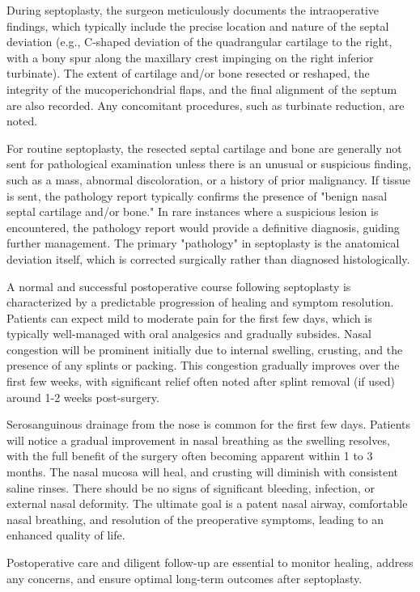 During septoplasty, the surgeon meticulously documents the intraoperative findings, which typically include the precise location and nature of the septal deviation (e.g., C-shaped deviation of the quadrangular cartilage to the right, with a bony spur along the maxillary crest impinging on the right inferior turbinate). The extent of cartilage and/or bone resected or reshaped, the integrity of the mucoperichondrial flaps, and the final alignment of the septum are also recorded. Any concomitant procedures, such as turbinate reduction, are noted.

For routine septoplasty, the resected septal cartilage and bone are generally not sent for pathological examination unless there is an unusual or suspicious finding, such as a mass, abnormal discoloration, or a history of prior malignancy. If tissue is sent, the pathology report typically confirms the presence of "benign nasal septal cartilage and/or bone." In rare instances where a suspicious lesion is encountered, the pathology report would provide a definitive diagnosis, guiding further management. The primary "pathology" in septoplasty is the anatomical deviation itself, which is corrected surgically rather than diagnosed histologically.

A normal and successful postoperative course following septoplasty is characterized by a predictable progression of healing and symptom resolution. Patients can expect mild to moderate pain for the first few days, which is typically well-managed with oral analgesics and gradually subsides. Nasal congestion will be prominent initially due to internal swelling, crusting, and the presence of any splints or packing. This congestion gradually improves over the first few weeks, with significant relief often noted after splint removal (if used) around 1-2 weeks post-surgery.

Serosanguinous drainage from the nose is common for the first few days. Patients will notice a gradual improvement in nasal breathing as the swelling resolves, with the full benefit of the surgery often becoming apparent within 1 to 3 months. The nasal mucosa will heal, and crusting will diminish with consistent saline rinses. There should be no signs of significant bleeding, infection, or external nasal deformity. The ultimate goal is a patent nasal airway, comfortable nasal breathing, and resolution of the preoperative symptoms, leading to an enhanced quality of life.

Postoperative care and diligent follow-up are essential to monitor healing, address any concerns, and ensure optimal long-term outcomes after septoplasty.

